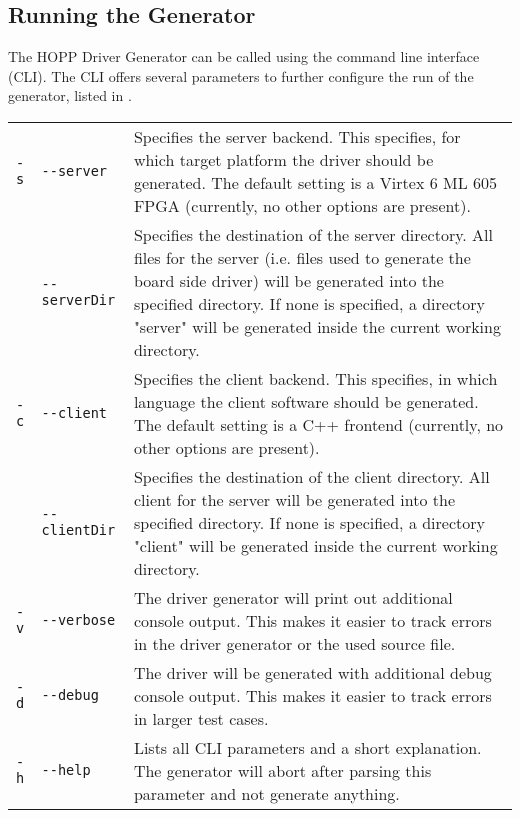 \documentclass{report}
\begin{document}
\subsection{Running the Generator}
The HOPP Driver Generator can be called using the command line interface (CLI). The CLI offers several parameters to further configure the run of the generator, listed in .

\begin{table}
\centering
\begin{tabular}{ ll | p{9cm} } 
\hline
\verb!-s! & \verb!--server! & Specifies the server backend. This specifies, for which target platform the driver should be generated. The default setting is a Virtex 6 ML 605 FPGA (currently, no other options are present).\\
& \verb!--serverDir! & Specifies the destination of the server directory. All files for the server (i.e. files used to generate the board side driver) will be generated into the specified directory. If none is specified, a directory "server" will be generated inside the current working directory.\\ \hline
\verb!-c! & \verb!--client! & Specifies the client backend. This specifies, in which language the client software should be generated. The default setting is a C++ frontend (currently, no other options are present).\\
& \verb!--clientDir! & Specifies the destination of the client directory. All client for the server will be generated into the specified directory. If none is specified, a directory "client" will be generated inside the current working directory.\\ \hline
\verb!-v! & \verb!--verbose! & The driver generator will print out additional console output. This makes it easier to track errors in the driver generator or the used source file.\\
\verb!-d! & \verb!--debug! & The driver will be generated with additional debug console output. This makes it easier to track errors in larger test cases.\\
\verb!-h! & \verb!--help! & Lists all CLI parameters and a short explanation. The generator will abort after parsing this parameter and not generate anything.\\ \hline

\end{tabular}
\end{table}
\end{document}

